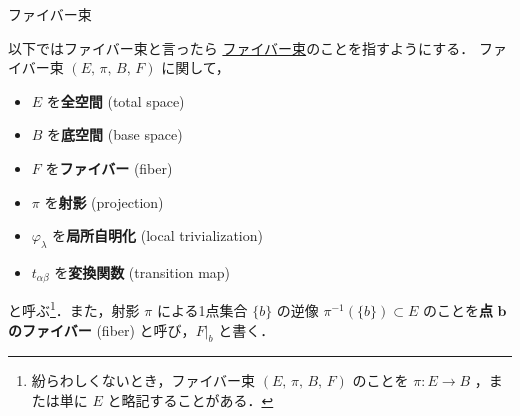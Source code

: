 \documentclass[TQFT_main]{subfiles}
\begin{document}
\begin{mydef}[label=def.fiber-1,breakable]{\cinfty ファイバー束}
\end{mydef}

以下ではファイバー束と言ったら \hyperref[def.fiber-1]{\cinfty ファイバー束}のことを指すようにする．
ファイバー束 $(E,\, \pi ,\, B,\, F)$ に関して，
\begin{itemize}
	\item $E$ を\textbf{全空間} (total space)
	\item $B$ を\textbf{底空間} (base space)
	\item $F$ を\textbf{ファイバー} (fiber)
	\item $\pi$ を\textbf{射影} (projection)
	\item $\varphi_\lambda$ を\textbf{局所自明化} (local trivialization)
	\item $t_{\alpha\beta}$ を\textbf{変換関数} (transition map)
\end{itemize}
と呼ぶ\footnote{紛らわしくないとき，ファイバー束 $(E,\, \pi,\, B,\, F)$ のことを $\pi \colon E \to B$ ，または単に $E$ と略記することがある．}．また，射影 $\pi$ による1点集合 $\{b\}$ の逆像 $\pi^{-1}(\{b\}) \subset E$ のことを\textbf{点} $\bm{b}$ \textbf{のファイバー} (fiber) と呼び，$F|_b$ と書く．\label{def:point-fiber}
\end{document}
